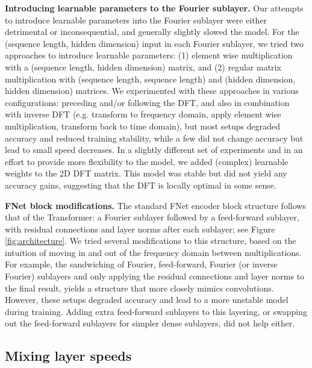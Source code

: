 \textbf{Introducing learnable parameters to the Fourier sublayer.} Our attempts to introduce learnable parameters into the Fourier sublayer were either detrimental or inconsequential, and generally slightly slowed the model. For the (sequence length, hidden dimension) input in each Fourier sublayer, we tried two approaches to introduce learnable parameters: (1) element wise multiplication with a (sequence length, hidden dimension) matrix, and (2) regular matrix multiplication with (sequence length, sequence length) and (hidden dimension, hidden dimension) matrices. We experimented with these approaches in various configurations: preceding and/or following the DFT, and also in combination with inverse DFT (e.g. transform to frequency domain, apply element wise multiplication, transform back to time domain), but most setups degraded accuracy and reduced training stability, while a few did not change accuracy but lead to small speed decreases. In a slightly different set of experiments and in an effort to provide more flexibility to the model, we added (complex) learnable weights to the 2D DFT matrix. This model was stable but did not yield any accuracy gains, suggesting that the DFT is locally optimal in some sense.

\textbf{FNet block modifications.} The standard FNet encoder block structure follows that of the Transformer: a Fourier sublayer followed by a feed-forward sublayer, with residual connections and layer norms after each sublayer; see Figure \ref{fig:architecture}. We tried several modifications to this structure, based on the intuition of moving in and out of the frequency domain between multiplications. For example, the sandwiching of Fourier, feed-forward, Fourier (or inverse Fourier) sublayers and only applying the residual connections and layer norms to the final result, yields a structure that more closely mimics convolutions. However, these setups degraded accuracy and lead to a more unstable model during training. Adding extra feed-forward sublayers to this layering, or swapping out the feed-forward sublayers for simpler dense sublayers, did not help either.



\subsection{Mixing layer speeds}
\label{app:mixing_speeds}

